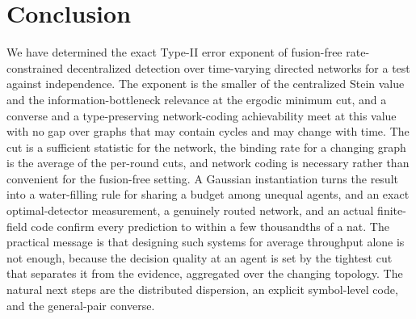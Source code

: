 \documentclass[journal]{IEEEtran}
\theoremstyle{definition}
\theoremstyle{remark}
\begin{document}
\section{Conclusion}\label{sec:conclusion}
We have determined the exact Type-II error exponent of fusion-free rate-constrained decentralized detection over
time-varying directed networks for a test against independence. The exponent is the smaller of the centralized
Stein value and the information-bottleneck relevance at the ergodic minimum cut, and a converse and a
type-preserving network-coding achievability meet at this value with no gap over graphs that may contain cycles
and may change with time. The cut is a sufficient statistic for the network, the binding rate for a changing graph
is the average of the per-round cuts, and network coding is necessary rather than convenient for the fusion-free
setting. A Gaussian instantiation turns the result into a water-filling rule for sharing a budget among unequal
agents, and an exact optimal-detector measurement, a genuinely routed network, and an actual finite-field code
confirm every prediction to within a few thousandths of a nat. The practical message is that designing such
systems for average throughput alone is not enough, because the decision quality at an agent is set by the
tightest cut that separates it from the evidence, aggregated over the changing topology. The natural next steps
are the distributed dispersion, an explicit symbol-level code, and the general-pair converse.



\end{document}
